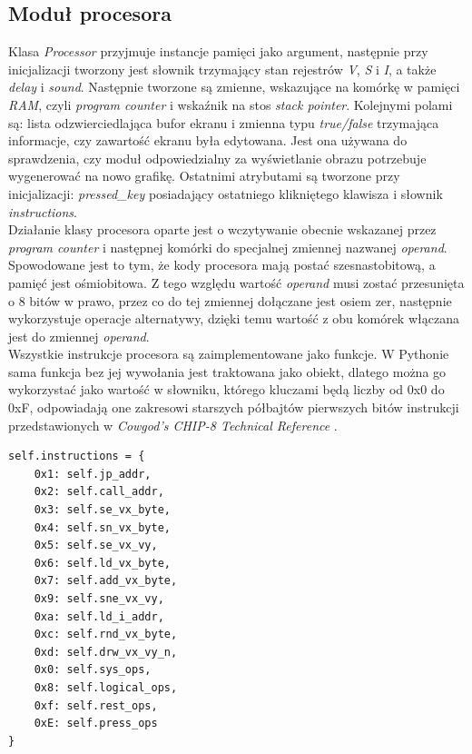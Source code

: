 \subsection{Moduł procesora}
Klasa \textit{Processor} przyjmuje instancje pamięci jako argument, następnie przy inicjalizacji tworzony jest słownik trzymający stan rejestrów \textit{V}, \textit{S} i \textit{I}, a także \textit{delay} i \textit{sound}. Następnie tworzone są zmienne, wskazujące na komórkę w pamięci \textit{RAM}, czyli \textit{program counter} i wskaźnik na stos \textit{stack pointer}. Kolejnymi polami są: lista odzwierciedlająca bufor ekranu i zmienna typu \textit{true/false} trzymająca informacje, czy zawartość ekranu była edytowana. Jest ona używana do sprawdzenia, czy moduł odpowiedzialny za wyświetlanie obrazu potrzebuje wygenerować na nowo grafikę. Ostatnimi atrybutami są tworzone przy inicjalizacji: \textit{pressed\_key} posiadający ostatniego klikniętego klawisza i słownik \textit{instructions}.\\

Działanie klasy procesora oparte jest o wczytywanie obecnie wskazanej przez \textit{program counter} i następnej komórki do specjalnej zmiennej nazwanej \textit{operand}. Spowodowane jest to tym, że kody procesora mają postać szesnastobitową, a pamięć jest ośmiobitowa. Z tego względu wartość \textit{operand} musi zostać przesunięta o 8 bitów w prawo, przez co do tej zmiennej dołączane jest osiem zer, następnie wykorzystuje operacje alternatywy, dzięki temu wartość z obu komórek włączana jest do zmiennej \textit{operand}. \\

Wszystkie instrukcje procesora są zaimplementowane jako funkcje. W Pythonie sama funkcja bez jej wywołania jest traktowana jako obiekt, dlatego można go wykorzystać jako wartość w słowniku, którego kluczami będą liczby od 0x0 do 0xF, odpowiadają one zakresowi starszych półbajtów pierwszych bitów instrukcji przedstawionych w \textit{Cowgod's CHIP-8 Technical Reference} \cite{Cowgod}.

\begin{lstlisting}[caption={Budowa słownika \textit{instructions}},captionpos=b]
self.instructions = {
    0x1: self.jp_addr,
    0x2: self.call_addr,
    0x3: self.se_vx_byte,
    0x4: self.sn_vx_byte,
    0x5: self.se_vx_vy,
    0x6: self.ld_vx_byte,
    0x7: self.add_vx_byte,
    0x9: self.sne_vx_vy,
    0xa: self.ld_i_addr,
    0xc: self.rnd_vx_byte,
    0xd: self.drw_vx_vy_n,
    0x0: self.sys_ops,
    0x8: self.logical_ops,
    0xf: self.rest_ops,
    0xE: self.press_ops
}
\end{lstlisting}

